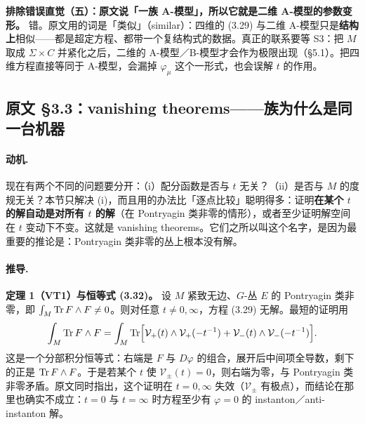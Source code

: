 \begin{warn}
\textbf{排除错误直觉（五）：原文说「一族 A-模型」，所以它就是二维 A-模型的参数变形。} 错。原文用的词是「类似」（similar）\pA{}：四维的 (3.29) 与二维 A-模型只是\textbf{结构上}相似——都是超定方程、都带一个复结构式的数据。真正的联系要等 S3：把 $M$ 取成 $\Sigma\times C$ 并紧化之后，二维的 A-模型／B-模型才会作为极限出现（§5.1）。把四维方程直接等同于 A-模型，会漏掉 $\varphi_\mu$ 这个一形式，也会误解 $t$ 的作用。
\end{warn}


\subsection{原文 §3.3：vanishing theorems——族为什么是同一台机器}

\paragraph{动机.}
现在有两个不同的问题要分开：（i）配分函数是否与 $t$ 无关？（ii）是否与 $M$ 的度规无关？本节只解决 (i)，而且用的办法比「逐点比较」聪明得多：证明\textbf{在某个 $t$ 的解自动是对所有 $t$ 的解}（在 Pontryagin 类非零的情形），或者至少证明解空间在 $t$ 变动下不变。这就是 vanishing theorems。它们之所以叫这个名字，是因为最重要的推论是：Pontryagin 类非零的丛上根本没有解。

\paragraph{推导.}

\textbf{定理 1（VT1）与恒等式 (3.32)。} 设 $M$ 紧致无边、$G$-丛 $E$ 的 Pontryagin 类非零，即 $\int_M\operatorname{Tr} F\wedge F\ne0$。则对任意 $t\ne0,\infty$，方程 (3.29) 无解。最短的证明用\pA{}
\begin{equation}
\int_M\operatorname{Tr} F\wedge F
=\int_M\operatorname{Tr}\Bigl[\mathcal V_+(t)\wedge\mathcal V_+(-t^{-1})
+\mathcal V_-(t)\wedge\mathcal V_-(-t^{-1})\Bigr].
\label{eq:vt1}
\end{equation}
这是一个分部积分恒等式：右端是 $F$ 与 $D\varphi$ 的组合，展开后中间项全导数，剩下的正是 $\operatorname{Tr} F\wedge F$。于是若某个 $t$ 使 $\mathcal V_\pm(t)=0$，则右端为零，与 Pontryagin 类非零矛盾\pA。原文同时指出，这个证明在 $t=0,\infty$ 失效（$\mathcal V_\pm$ 有极点），而结论在那里也确实不成立：$t=0$ 与 $t=\infty$ 时方程至少有 $\varphi=0$ 的 instanton／anti-instanton 解\pA{}。

